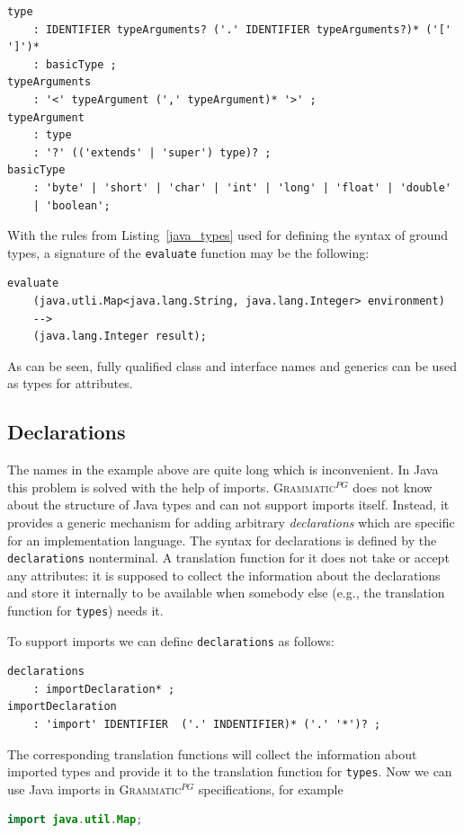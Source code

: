 \documentclass{llncs2e/llncs}
\newcommand{\lstref}[1]{Listing~\ref{#1}}
\newcommand{\ATF}{\textsc{Grammatic}$^{PG}$}
\begin{document}
{\begin{lstlisting}[caption=Ground type syntax for Java 5,float=htbp,label=java_types]
type
	: IDENTIFIER typeArguments? ('.' IDENTIFIER typeArguments?)* ('[' ']')*
	: basicType ;
typeArguments
	: '<' typeArgument (',' typeArgument)* '>' ;
typeArgument
	: type
	: '?' (('extends' | 'super') type)? ;
basicType
	: 'byte' | 'short' | 'char' | 'int' | 'long' | 'float' | 'double' 
	| 'boolean';
\end{lstlisting}


With the rules from \lstref{java_types} used for defining the syntax of ground types, a signature of the \texttt{evaluate} function may be the following:
\begin{lstlisting}
evaluate
	(java.utli.Map<java.lang.String, java.lang.Integer> environment) 
	--> 
	(java.lang.Integer result);
\end{lstlisting}
As can be seen, fully qualified class and interface names and generics can be used as types for attributes. 

\subsection{Declarations}

The names in the example above are quite long which is inconvenient. In Java this problem is solved with the help of imports. \ATF{} does not know about the structure of Java types and can not support imports itself. Instead, it provides a generic mechanism for adding arbitrary \emph{declarations} which are specific for an implementation language. The syntax for declarations is defined by the \texttt{declarations} nonterminal. A translation function for it does not take or accept any attributes: it is supposed to collect the information about the declarations and store it internally to be available when somebody else (e.g., the translation function for \texttt{types}) needs it.

To support imports we can define \texttt{declarations} as follows:
\begin{lstlisting}
declarations
	: importDeclaration* ;
importDeclaration
	: 'import' IDENTIFIER  ('.' INDENTIFIER)* ('.' '*')? ;
\end{lstlisting}
The corresponding translation functions will collect the information about imported types and provide it to the translation function for \texttt{types}. Now we can use Java imports in \ATF{} specifications, for example
\begin{lstlisting}[language=Java]
import java.util.Map;


\end{lstlisting}}
\end{document}
